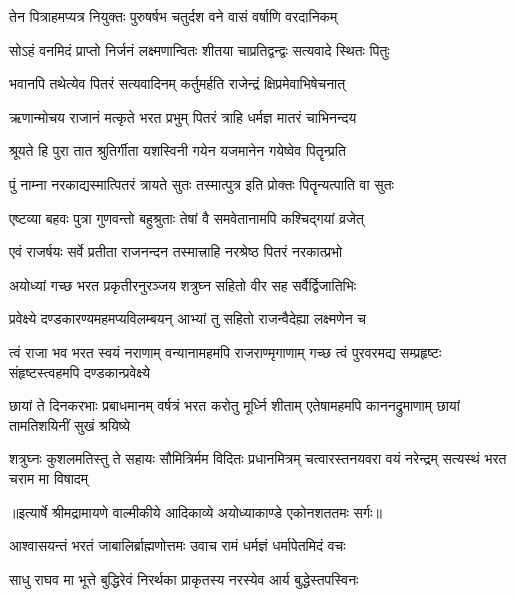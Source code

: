 \twolineshloka
{तेन पित्राहमप्यत्र नियुक्तः पुरुषर्षभ}
{चतुर्दश वने वासं वर्षाणि वरदानिकम्} %

\twolineshloka
{सोऽहं वनमिदं प्राप्तो निर्जनं लक्ष्मणान्वितः}
{शीतया चाप्रतिद्वन्द्वः सत्यवादे स्थितः पितुः} %

\twolineshloka
{भवानपि तथेत्येव पितरं सत्यवादिनम्}
{कर्तुमर्हति राजेन्द्रं क्षिप्रमेवाभिषेचनात्} %

\twolineshloka
{ऋणान्मोचय राजानं मत्कृते भरत प्रभुम्}
{पितरं त्राहि धर्मज्ञ मातरं चाभिनन्दय} %

\twolineshloka
{श्रूयते हि पुरा तात श्रुतिर्गीता यशस्विनी}
{गयेन यजमानेन गयेष्वेव पितॄन्प्रति} %

\twolineshloka
{पुं नाम्ना नरकाद्यस्मात्पितरं त्रायते सुतः}
{तस्मात्पुत्र इति प्रोक्तः पितॄन्यत्पाति वा सुतः} %

\twolineshloka
{एष्टव्या बहवः पुत्रा गुणवन्तो बहुश्रुताः}
{तेषां वै समवेतानामपि कश्चिद्गयां व्रजेत्} %

\twolineshloka
{एवं राजर्षयः सर्वे प्रतीता राजनन्दन}
{तस्मात्त्राहि नरश्रेष्ठ पितरं नरकात्प्रभो} %

\twolineshloka
{अयोध्यां गच्छ भरत प्रकृतीरनुरञ्जय}
{शत्रुघ्न सहितो वीर सह सर्वैर्द्विजातिभिः} %

\twolineshloka
{प्रवेक्ष्ये दण्डकारण्यमहमप्यविलम्बयन्}
{आभ्यां तु सहितो राजन्वैदेह्या लक्ष्मणेन च} %

\fourlineindentedshloka
{त्वं राजा भव भरत स्वयं नराणाम्}
{वन्यानामहमपि राजराण्मृगाणाम्}
{गच्छ त्वं पुरवरमद्य सम्प्रहृष्टः}
{संहृष्टस्त्वहमपि दण्डकान्प्रवेक्ष्ये} %

\fourlineindentedshloka
{छायां ते दिनकरभाः प्रबाधमानम्}
{वर्षत्रं भरत करोतु मूर्ध्नि शीताम्}
{एतेषामहमपि काननद्रुमाणाम्}
{छायां तामतिशयिनीं सुखं श्रयिष्ये} %

\fourlineindentedshloka
{शत्रुघ्नः कुशलमतिस्तु ते सहायः}
{सौमित्रिर्मम विदितः प्रधानमित्रम्}
{चत्वारस्तनयवरा वयं नरेन्द्रम्}
{सत्यस्थं भरत चराम मा विषादम्} %


{॥इत्यार्षे श्रीमद्रामायणे वाल्मीकीये आदिकाव्ये अयोध्याकाण्डे एकोनशततमः सर्गः॥}


\twolineshloka
{आश्वासयन्तं भरतं जाबालिर्ब्राह्मणोत्तमः}
{उवाच रामं धर्मज्ञं धर्मापेतमिदं वचः} %

\twolineshloka
{साधु राघव मा भूत्ते बुद्धिरेवं निरर्थका}
{प्राकृतस्य नरस्येव आर्य बुद्धेस्तपस्विनः} %

